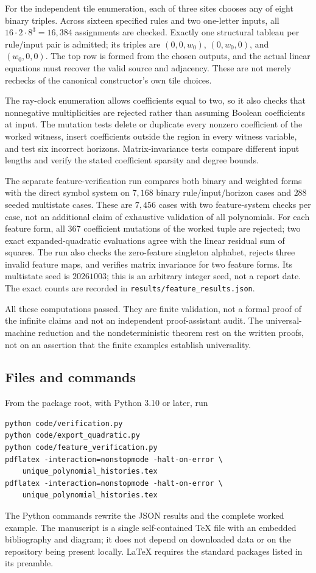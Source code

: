 \documentclass[11pt,letterpaper]{article}
\numberwithin{equation}{section}
\theoremstyle{definition}
\newcommand{\codename}[1]{\texttt{\small #1}}
\begin{document}
For the independent tile enumeration, each of three sites chooses any of
eight binary triples. Across sixteen specified rules and two one-letter
inputs, all $16\cdot2\cdot8^3=16{,}384$ assignments are checked. Exactly
one structural tableau per rule/input pair is admitted; its triples are
$(0,0,w_0)$, $(0,w_0,0)$, and $(w_0,0,0)$. The top row is formed from the
chosen outputs, and the actual linear equations must recover the valid
source and adjacency. These are not merely rechecks of the canonical
constructor's own tile choices.

The ray-clock enumeration allows coefficients equal to two, so it also
checks that nonnegative multiplicities are rejected rather than assuming
Boolean coefficients at input. The mutation tests delete or duplicate
every nonzero coefficient of the worked witness, insert coefficients
outside the region in every witness variable, and test six incorrect
horizons. Matrix-invariance tests compare different input lengths and
verify the stated coefficient sparsity and degree bounds.


The separate feature-verification run compares both binary and weighted
forms with the direct symbol system on $7{,}168$ binary
rule/input/horizon cases and $288$ seeded multistate cases. These are
$7{,}456$ cases with two feature-system checks per case, not an additional
claim of exhaustive validation of all polynomials. For each feature form,
all $367$ coefficient mutations of the worked tuple are rejected; two
exact expanded-quadratic evaluations agree with the linear residual
sum of squares. The run also checks the zero-feature singleton alphabet,
rejects three invalid feature maps, and verifies matrix invariance for
two feature forms. Its multistate seed is $20261003$; this is an arbitrary
integer seed, not a report date. The exact counts are recorded in
\codename{results/feature\_results.json}.

All these computations passed. They are finite validation, not a formal
proof of the infinite claims and not an independent proof-assistant audit.
The universal-machine reduction and the nondeterministic theorem rest on
the written proofs, not on an assertion that the finite examples establish
universality.

\subsection{Files and commands}

From the package root, with Python 3.10 or later, run
\begin{verbatim}
python code/verification.py
python code/export_quadratic.py
python code/feature_verification.py
pdflatex -interaction=nonstopmode -halt-on-error \
    unique_polynomial_histories.tex
pdflatex -interaction=nonstopmode -halt-on-error \
    unique_polynomial_histories.tex
\end{verbatim}
The Python commands rewrite the JSON results and the complete worked
example. The manuscript is a single self-contained TeX file with an
embedded bibliography and diagram; it does not depend on downloaded data
or on the repository being present locally. LaTeX requires the standard
packages listed in its preamble.
\end{document}
